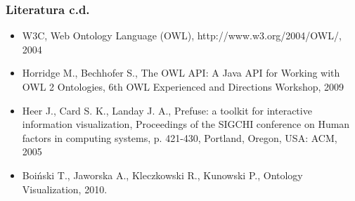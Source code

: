 \documentclass{beamer}
\begin{document}
\begin{frame}
  \frametitle{Literatura c.d.}
\begin{itemize}

\item W3C, Web Ontology Language (OWL), http://www.w3.org/2004/OWL/, 2004
\item Horridge M., Bechhofer S., The OWL API: A Java API for Working with OWL 2 Ontologies, 6th OWL Experienced and Directions Workshop, 2009
\item Heer J., Card S. K., Landay J. A., Prefuse: a toolkit for interactive information visualization, Proceedings of the SIGCHI conference on Human factors in computing systems, p. 421-430, Portland, Oregon, USA: ACM, 2005
\item Boiński T., Jaworska A., Kleczkowski R., Kunowski P., Ontology Visualization, 2010.
\end{itemize}
\end{frame}
\end{document}

